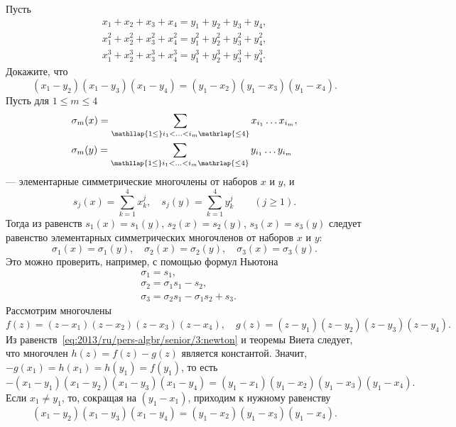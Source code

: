 \problem
Пусть
\begin{gather*}
    x_1 + x_2 + x_3 + x_4 = y_1 + y_2 + y_3 + y_4
,\\
    x_1^2 + x_2^2 + x_3^2 + x_4^2
=
    y_1^2 + y_2^2 + y_3^2 + y_4^2
,\\
    x_1^3 + x_2^3 + x_3^3 + x_4^3
=
    y_1^3 + y_2^3 + y_3^3 + y_4^3
.\end{gather*}
Докажите, что
\[
    (x_1 - y_2) (x_1 - y_3) (x_1 - y_4)
=
    (y_1 - x_2) (y_1 - x_3) (y_1 - x_4)
.\]
\solution
Пусть для $1 \leq m \leq 4$
\begin{align*}&
    \sigma_m(x)
=
    \sum\limits_{\mathllap{1 \leq} i_1 < \ldots < i_m \mathrlap{\leq 4}}
        x_{i_1} \ldots x_{i_m}
,\\&
    \sigma_m(y)
=
    \sum\limits_{\mathllap{1 \leq} i_1 < \ldots < i_m \mathrlap{\leq 4}}
        y_{i_1} \ldots y_{i_m}
\end{align*}
--- элементарные симметрические многочлены от наборов $x$ и $y$, и
\[
    s_j(x)
=
    \sum\limits_{k = 1}^{4}
        x_k^j
,\quad
    s_j(y)
=
    \sum\limits_{k = 1}^{4}
        y_k^j
\qquad
    (j \geq 1)
.\]
Тогда из равенств $s_1(x) = s_1(y)$, $s_2(x) = s_2(y)$, $s_3(x) = s_3(y)$
следует равенство элементарных симметрических многочленов
от наборов $x$ и $y$:
\begin{equation} \label{eq:2013/ru/pers-algbr/senior/3:newton}
    \sigma_1(x) = \sigma_1(y)
,\quad
    \sigma_2(x) = \sigma_2(y)
,\quad
    \sigma_3(x) = \sigma_3(y)
.\end{equation}
Это можно проверить, например, с помощью формул Ньютона
\begin{align*}&
    \sigma_1 = s_1
,\\&
    \sigma_2 = \sigma_1 s_1 - s_2
,\\&
    \sigma_3 = \sigma_2 s_1 - \sigma_1 s_2 + s_3
.\end{align*}
Рассмотрим многочлены
\[
    f(z) = (z - x_1) (z - x_2) (z - x_3) (z - x_4)
,\quad
    g(z) = (z - y_1) (z - y_2) (z - y_3) (z - y_4)
.\]
Из равенств~\eqref{eq:2013/ru/pers-algbr/senior/3:newton} и теоремы Виета
следует, что многочлен $h(z) = f(z) - g(z)$ является константой.
Значит, $-g(x_1) = h(x_1) = h(y_1) = f(y_1)$, то есть
\begin{equation}
    - (x_1 - y_1) (x_1-y_2) (x_1 - y_3) (x_1 - y_4)
=
    (y_1 - x_1) (y_1 - x_2) (y_1 - x_3) (y_1 - x_4)
.\end{equation}
Если $x_1 \neq y_1$, то, сокращая на $(y_1 - x_1)$, приходим к нужному
равенству
\begin{equation} \label{eq:2013/ru/pers-algbr/senior/3:desired}
    (x_1 - y_2) (x_1 - y_3) (x_1 - y_4)
=
    (y_1 - x_2) (y_1 - x_3) (y_1 - x_4)
.\end{equation}
